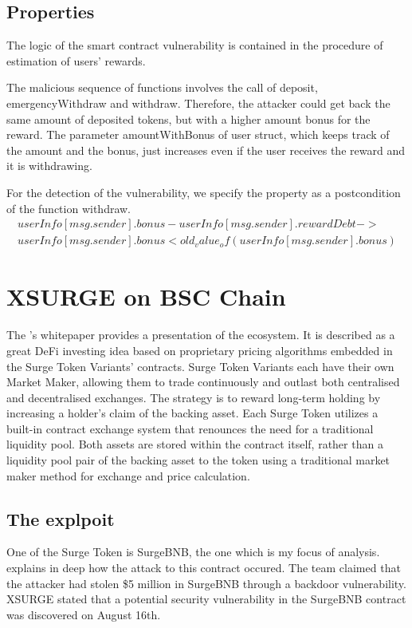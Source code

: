 \subsection{Properties}
The logic of the smart contract vulnerability is contained in the procedure of estimation of users' rewards.

The malicious sequence of functions involves the call of deposit, emergencyWithdraw and withdraw.
Therefore, the attacker could get back the same amount of deposited tokens, but with a higher amount bonus for the reward. 
The parameter amountWithBonus of user struct, which keeps track of the amount and the bonus, just increases even if the user receives the reward and it is withdrawing. 

For the detection of the vulnerability, we specify the property as a postcondition of the function withdraw. 
\begin{equation}
    \begin{split}
        userInfo[msg.sender].bonus-userInfo[msg.sender].rewardDebt ->  
        \\userInfo[msg.sender].bonus < old_value_of(userInfo[msg.sender].bonus)
    \end{split}
\end{equation}

\section{XSURGE on BSC Chain}   
\label{sec:Exploits:XSURGE}
The \citet{XSurgeWeb}'s whitepaper provides a presentation of the ecosystem.
It is described as a great DeFi investing idea based on proprietary pricing algorithms embedded in the Surge Token Variants' contracts.
Surge Token Variants each have their own Market Maker, allowing them to trade continuously and outlast both 
centralised and decentralised exchanges. 
The strategy is to reward long-term holding by increasing a
holder's claim of the backing asset. Each Surge Token utilizes a built-in contract exchange system that renounces the need for
a traditional liquidity pool. Both assets are stored within the contract itself, 
rather than a liquidity pool pair of the backing asset to the
token using a traditional market maker method for exchange and price calculation.

\subsection{The explpoit}
One of the Surge Token is SurgeBNB, the one which is my focus of analysis.
\citet{XSurgeBNB} explains in deep how the attack to this contract occured. 
The team claimed that the attacker had stolen \$5 million in SurgeBNB through a backdoor vulnerability.
XSURGE stated that a potential security vulnerability in the SurgeBNB contract was discovered on August 16th.

